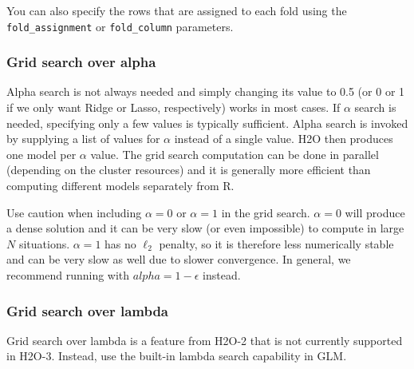 You can also specify the rows that are assigned to each fold using the \texttt{fold\_assignment}
or \texttt{fold\_column} parameters.

\bigskip
\waterExampleInR




\subsubsection{Grid search over alpha}

Alpha search is not always needed and simply changing its value to 0.5 (or 0 or 1 if we only want Ridge or Lasso,
respectively) works in most cases. If $\alpha$ search is needed, specifying only a few values is typically sufficient. Alpha
search is invoked by supplying a list of values for $\alpha$ instead of a single value. H2O then produces one model
per $\alpha$ value. The grid search computation can be done in parallel (depending on the cluster resources) and it
is generally more efficient than computing different models separately from R.

Use caution when including $\alpha=0$ or $\alpha=1$ in the grid search. $\alpha=0$ will produce a dense solution
and it can be very slow (or even impossible) to compute in large $N$ situations. $\alpha=1$ has no  $\ell_2$ penalty, so
it is therefore less numerically stable and can be very slow as well due to slower convergence. In general, we recommend running with $alpha=1-\epsilon$ instead.

\waterExampleInR


\subsubsection{Grid search over lambda}


% 

Grid search over lambda is a feature from H2O-2 that is not currently supported in H2O-3.  Instead, use the built-in lambda
search capability in GLM.

